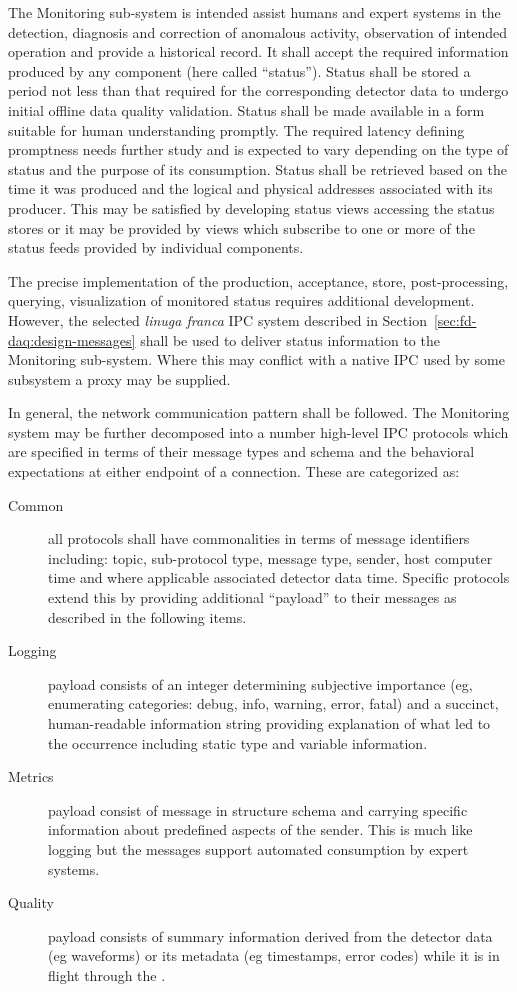 The  Monitoring sub-system is intended assist humans and expert systems in the detection, diagnosis and correction of anomalous activity, observation of intended operation and provide a historical record.
It shall accept the required information produced by any  component (here called ``status'').
Status shall be stored a period not less than that required for the corresponding detector data to undergo initial offline data quality validation.
Status shall be made available in a form suitable for human understanding promptly. 
The required latency defining promptness needs further study and is expected to vary depending on the type of status and the purpose of its consumption.  
Status shall be retrieved based on the time it was produced and the logical and physical addresses associated with its producer.
This may be satisfied by developing status views accessing the status stores or it may be provided by views which subscribe to one or more of the status feeds provided by individual components.

The precise implementation of the production, acceptance, store, post-processing, querying, visualization of monitored status requires additional development. 
However, the selected \textit{linuga franca} IPC system described in Section~\ref{sec:fd-daq:design-messages} shall be used to deliver status information to the Monitoring sub-system. 
Where this may conflict with a native IPC used by some subsystem a proxy may be supplied. 

In general, the  network communication pattern shall be followed. 
The Monitoring system may be further decomposed into a number high-level IPC protocols which are specified in terms of their message types and schema and the behavioral expectations at either endpoint of a connection.
These are categorized as:


\begin{description}
\item[Common] all protocols shall have commonalities in terms of message identifiers including:  topic, sub-protocol type, message type, sender, host computer time and where applicable associated detector data time.  Specific protocols extend this by providing additional ``payload'' to their messages as described in the following items.
 
\item[Logging] payload consists of an integer determining subjective importance (eg, enumerating categories: debug, info, warning, error, fatal) and a succinct, human-readable information string providing explanation of what led to the occurrence including static type and variable information. 
\item[Metrics] payload consist of message in structure schema and carrying specific information about predefined aspects of the sender.  This is much like logging but the messages support automated consumption by expert systems.  
\item[Quality] payload consists of summary information derived from the detector data (eg waveforms) or its metadata (eg timestamps, error codes) while it is in flight through the .
\end{description}

